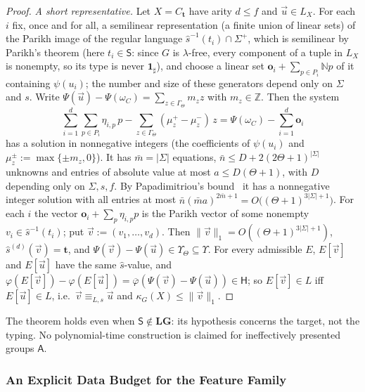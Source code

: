 \documentclass[11pt]{article}
\numberwithin{equation}{section}
\theoremstyle{plain}
\theoremstyle{definition}
\theoremstyle{remark}
\newcommand{\tuple}[1]{\vec{#1}}
\theoremstyle{plain}
\begin{document}
\begin{proof}
\emph{A short representative.}  Let $X=C_{\mathbf t}$ have arity $d\le f$ and
$\tuple u\in L_X$.  For each $i$ fix, once and for all, a semilinear representation
(a finite union of linear sets) of the Parikh image of the regular language $\widehat s^{-1}(t_i)\cap\Sigma^+$,
which is semilinear by Parikh's theorem \cite{Parikh1966}
(here $t_i\in\mathsf S$: since $G$ is $\lambda$-free, every component of a tuple in
$L_X$ is nonempty, so its type is never $\mathbf 1_\sharp$), and
choose a linear set $\mathbf o_i+\sum_{p\in P_i}\mathbb Np$ of it containing $\psi(u_i)$;
the number and size of these generators depend only on $\Sigma$ and $s$.  Write
$\Psi(\tuple u)-\Psi(\omega_C)=\sum_{z\in\Gamma_\Theta}m_zz$ with $m_z\in\mathbb Z$.
Then the system
\[
 \sum_{i=1}^d\sum_{p\in P_i}\eta_{i,p}\,p-\sum_{z\in\Gamma_\Theta}(\mu^+_z-\mu^-_z)\,z
 =\Psi(\omega_C)-\sum_{i=1}^d\mathbf o_i
\]
has a solution in nonnegative integers (the coefficients of $\psi(u_i)$ and
$\mu^\pm_z:=\max\{\pm m_z,0\}$).  It has $\bar m=|\Sigma|$ equations,
$\bar n\le D+2(2\Theta+1)^{|\Sigma|}$ unknowns and entries of absolute value at most
$a\le D(\Theta+1)$, with $D$ depending only on $\Sigma,s,f$.  By Papadimitriou's
bound~\cite{Papadimitriou1981} it has a nonnegative integer solution with all
entries at most $\bar n(\bar m a)^{2\bar m+1}=O\bigl((\Theta+1)^{3|\Sigma|+1}\bigr)$.  For each $i$ the
vector $\mathbf o_i+\sum_p\eta_{i,p}p$ is the Parikh vector of some nonempty
$v_i\in\widehat s^{-1}(t_i)$; put $\tuple v:=(v_1,\ldots,v_d)$.  Then
$\|\tuple v\|_1=O((\Theta+1)^{3|\Sigma|+1})$, $\widehat s^{(d)}(\tuple v)=\mathbf t$, and
$\Psi(\tuple v)-\Psi(\tuple u)\in\Upsilon_\Theta\subseteq\Upsilon$.  For every admissible
$E$, $E[\tuple v]$ and $E[\tuple u]$ have the same $\widehat s$-value, and
$\varphi(E[\tuple v])-\varphi(E[\tuple u])=\overline\varphi(\Psi(\tuple v)-\Psi(\tuple u))
\in\mathsf H$; so $E[\tuple v]\in L$ iff $E[\tuple u]\in L$, i.e.\
$\tuple v\equiv_{L,s}\tuple u$ and $\kappa_G(X)\le\|\tuple v\|_1$.
\end{proof}

The theorem holds even when $\mathsf S\notin\mathbf{LG}$: its hypothesis concerns the
target, not the typing.  No polynomial-time construction is claimed for
ineffectively presented groups $\mathsf A$.

\subsubsection{An Explicit Data Budget for the Feature Family}
\label{app:feature-budget}
\end{document}
